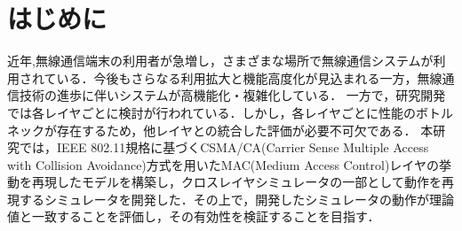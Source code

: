 \documentclass[a4paper, 10pt]{ltjsarticle}
\begin{document}
\setlength{\abovedisplayskip}{-1em}
\setlength{\columnsep}{7.5mm}

\twocolumn[
    \begin{center}
        {\vspace{-1em}}

        {\fontsize{15pt}{15pt}\selectfont{クロスレイヤシミュレータにおける無線LAN評価モデルの検討}}

        {\vspace{1.3em}}

        {\fontsize{13pt}{13pt}\selectfont{A Study of a Wireless LAN Evaluation Model in a Cross-Layer Simulator}}
    \end{center}

    \vspace{0.1em}

    \begin{flushright}
      {\fontsize{11pt}{11pt}\selectfont{T5-16 \, 下沢亮太郎}}
      \\
      {\fontsize{11pt}{11pt}\selectfont{指導教員 \, 設樂勇}}
    \end{flushright}

    \vspace{1em}

    \thispagestyle{empty}
]

\section{はじめに}


近年,無線通信端末の利用者が急増し，さまざまな場所で無線通信システムが利用されている．今後もさらなる利用拡大と機能高度化が見込まれる一方，無線通信技術の進歩に伴いシステムが高機能化・複雑化している．
一方で，研究開発では各レイヤごとに検討が行われている．しかし，各レイヤごとに性能のボトルネックが存在するため，他レイヤとの統合した評価が必要不可欠である．
本研究では，IEEE 802.11規格に基づくCSMA/CA(Carrier Sense Multiple Access with Collision Avoidance)方式を用いたMAC(Medium Access Control)レイヤの挙動を再現したモデルを構築し，クロスレイヤシミュレータの一部として動作を再現するシミュレータを開発した．その上で，開発したシミュレータの動作が理論値と一致することを評価し，その有効性を検証することを目指す．
\end{document}
